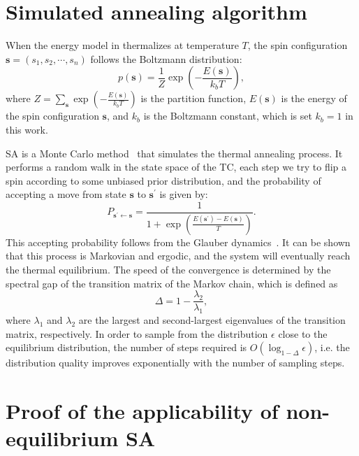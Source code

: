 \documentclass[twocolumn,superscriptaddress,english,showpacs,longbibliography]{revtex4-2}
\newcommand{\vs}{{\mathbf{s}}}
\begin{document}
\section{Simulated annealing algorithm}\label{app:sa}
When the energy model in  thermalizes at temperature $T$, the spin configuration $\vs = (s_1, s_2, \cdots, s_n)$ follows the Boltzmann distribution:
\begin{equation}
    p(\vs) = \frac{1}{Z}\exp\left(- \frac{E({\vs})}{k_bT}\right),
\end{equation}
where $Z = \sum_{\vs} \exp\left(-\frac{E({\vs})}{k_bT}\right)$ is the partition function, 
$E({\vs})$ is the energy of the spin configuration $\vs$, and $k_b$ is the Boltzmann constant, which is set $k_b = 1$ in this work.

SA is a Monte Carlo method~\cite{metropolis1953equation} that simulates the thermal annealing process.
It performs a random walk in the state space of the TC, each step we try to flip a spin according to some unbiased prior distribution,
and the probability of accepting a move from state $\vs$ to $\vs^\prime$ is given by:
\begin{equation}
    P_{\vs^\prime\leftarrow \vs} = \frac{1}{1+\exp\left(\frac{E({\vs^\prime}) - E({\vs})}{T}\right)}.
\end{equation}
This accepting probability follows from the Glauber dynamics~\cite{glauber1963time}.
It can be shown that this process is Markovian and ergodic, and the system will eventually reach the thermal equilibrium.
The speed of the convergence is determined by the spectral gap of the transition matrix of the Markov chain, which is defined as
\begin{equation}
    \Delta = 1 - \frac{\lambda_2}{\lambda_1},
\end{equation}
where $\lambda_1$ and $\lambda_2$ are the largest and second-largest eigenvalues of the transition matrix, respectively.
In order to sample from the distribution $\epsilon$ close to the equilibrium distribution, the number of steps required is $O(\log_{1-\Delta} \epsilon)$, i.e. the distribution quality improves exponentially with the number of sampling steps.

\section{Proof of the applicability of non-equilibrium SA}\label{proof-of_non-equilibrium-SA}
\end{document}
